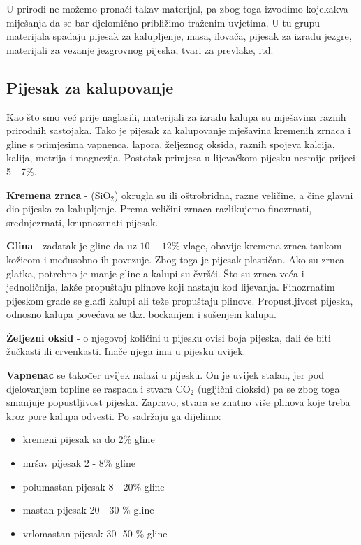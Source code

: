 \documentclass[a4paper,12pt]{article}
\numberwithin{figure}{section}
\begin{document}
U prirodi ne možemo pronaći takav materijal, pa zbog toga izvodimo kojekakva miješanja da se bar djelomično približimo traženim uvjetima. U tu grupu materijala spadaju pijesak za kalupljenje, masa, ilovača, pijesak za izradu jezgre, materijali za vezanje jezgrovnog pijeska, tvari za prevlake, itd.
\subsection{Pijesak za kalupovanje}
Kao što smo već prije naglasili, materijali za izradu kalupa su mješavina raznih prirodnih sastojaka. Tako je pijesak za kalupovanje mješavina kremenih zrnaca i gline s primjesima vapnenca, lapora, željeznog oksida, raznih spojeva kalcija, kalija, metrija i magnezija. Postotak primjesa u lijevačkom pijesku nesmije prijeci 5 - 7$\%$.\par
\textbf{Kremena zrnca} - (SiO$_{2}$) okrugla su ili oštrobridna, razne veličine, a čine glavni dio pijeska za kalupljenje. Prema veličini zrnaca razlikujemo finozrnati, srednjezrnati, krupnozrnati pijesak.\par
\textbf{Glina} - zadatak je gline da uz $10 - 12\%$ vlage, obavije kremena zrnca tankom kožicom i međusobno ih povezuje. Zbog toga je pijesak plastičan. Ako su zrnca glatka, potrebno je manje gline a kalupi su čvršći. Što su zrnca veća i jednoličnija, lakše propuštaju plinove koji nastaju kod lijevanja. Finozrnatim pijeskom grade se glađi kalupi ali teže propuštaju plinove. Propustljivost pijeska, odnosno kalupa povećava se tkz. bockanjem i sušenjem kalupa.\par
\textbf{Željezni oksid} - o njegovoj količini u pijesku ovisi boja pijeska, dali će biti žučkasti ili crvenkasti. Inače njega ima u pijesku uvijek. \par 
\textbf{Vapnenac} se također uvijek nalazi u pijesku. On je uvijek stalan, jer pod djelovanjem topline se raspada i stvara CO$_{2}$ (ugljični dioksid) pa se zbog toga smanjuje popustljivost pijeska. Zapravo, stvara se znatno više plinova koje treba kroz pore kalupa odvesti. Po sadržaju ga dijelimo:
\begin{itemize}
\item kremeni pijesak sa do 2$\%$ gline
\item mršav pijesak 2 - 8$\%$ gline
\item polumastan pijesak 8 - 20$\%$ gline
\item mastan pijesak 20 - 30 $\%$ gline
\item vrlomastan pijesak 30 -50 $\%$ gline
\end{itemize}
\end{document}
